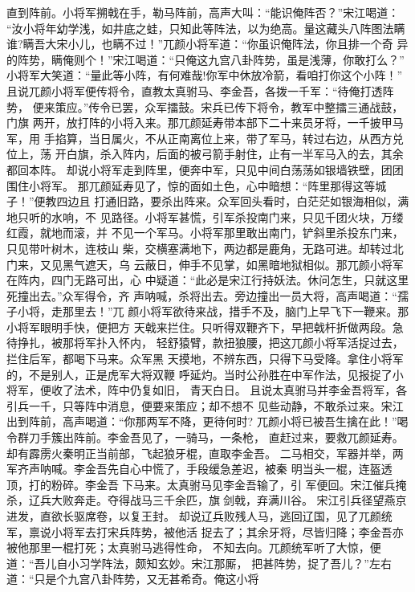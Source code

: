 直到阵前。小将军搠戟在手，勒马阵前，高声大叫：“能识俺阵否？”宋江喝道：
“汝小将年幼学浅，如井底之蛙，只知此等阵法，以为绝高。量这藏头八阵图法瞒
谁?瞒吾大宋小儿，也瞒不过！”兀颜小将军道：“你虽识俺阵法，你且排一个奇
异的阵势，瞒俺则个！”宋江喝道：“只俺这九宫八卦阵势，虽是浅薄，你敢打么？”
小将军大笑道：“量此等小阵，有何难哉!你军中休放冷箭，看咱打你这个小阵！”
且说兀颜小将军便传将令，直教太真驸马、李金吾，各拨一千军：“待俺打透阵势，
便来策应。”传令已罢，众军擂鼓。宋兵已传下将令，教军中整擂三通战鼓，门旗
两开，放打阵的小将入来。那兀颜延寿带本部下二十来员牙将，一千披甲马军，用
手掐算，当日属火，不从正南离位上来，带了军马，转过右边，从西方兑位上，荡
开白旗，杀入阵内，后面的被弓箭手射住，止有一半军马入的去，其余都回本阵。
却说小将军走到阵里，便奔中军，只见中间白荡荡如银墙铁壁，团团围住小将军。
那兀颜延寿见了，惊的面如土色，心中暗想：“阵里那得这等城子！”便教四边且
打通旧路，要杀出阵来。众军回头看时，白茫茫如银海相似，满地只听的水响，不
见路径。小将军甚慌，引军杀投南门来，只见千团火块，万缕红霞，就地而滚，并
不见一个军马。小将军那里敢出南门，铲斜里杀投东门来，只见带叶树木，连枝山
柴，交横塞满地下，两边都是鹿角，无路可进。却转过北门来，又见黑气遮天，乌
云蔽日，伸手不见掌，如黑暗地狱相似。那兀颜小将军在阵内，四门无路可出，心
中疑道：“此必是宋江行持妖法。休问怎生，只就这里死撞出去。”众军得令，齐
声呐喊，杀将出去。旁边撞出一员大将，高声喝道：“孺子小将，走那里去！”兀
颜小将军欲待来战，措手不及，脑门上早飞下一鞭来。那小将军眼明手快，便把方
天戟来拦住。只听得双鞭齐下，早把戟杆折做两段。急待挣扎，被那将军扑入怀内，
轻舒猿臂，款扭狼腰，把这兀颜小将军活捉过去，拦住后军，都喝下马来。众军黑
天摸地，不辨东西，只得下马受降。拿住小将军的，不是别人，正是虎军大将双鞭
呼延灼。当时公孙胜在中军作法，见报捉了小将军，便收了法术，阵中仍复如旧，
青天白日。
且说太真驸马并李金吾将军，各引兵一千，只等阵中消息，便要来策应；却不想不
见些动静，不敢杀过来。宋江出到阵前，高声喝道：“你那两军不降，更待何时?
兀颜小将已被吾生擒在此！”喝令群刀手簇出阵前。李金吾见了，一骑马，一条枪，
直赶过来，要救兀颜延寿。却有霹雳火秦明正当前部，飞起狼牙棍，直取李金吾。
二马相交，军器并举，两军齐声呐喊。李金吾先自心中慌了，手段缓急差迟，被秦
明当头一棍，连盔透顶，打的粉碎。李金吾下马来。太真驸马见李金吾输了，引
军便回。宋江催兵掩杀，辽兵大败奔走。夺得战马三千余匹，旗剑戟，弃满川谷。
宋江引兵径望燕京进发，直欲长驱席卷，以复王封。
却说辽兵败残人马，逃回辽国，见了兀颜统军，禀说小将军去打宋兵阵势，被他活
捉去了；其余牙将，尽皆归降；李金吾亦被他那里一棍打死；太真驸马逃得性命，
不知去向。兀颜统军听了大惊，便道：“吾儿自小习学阵法，颇知玄妙。宋江那厮，
把甚阵势，捉了吾儿？”左右道：“只是个九宫八卦阵势，又无甚希奇。俺这小将
